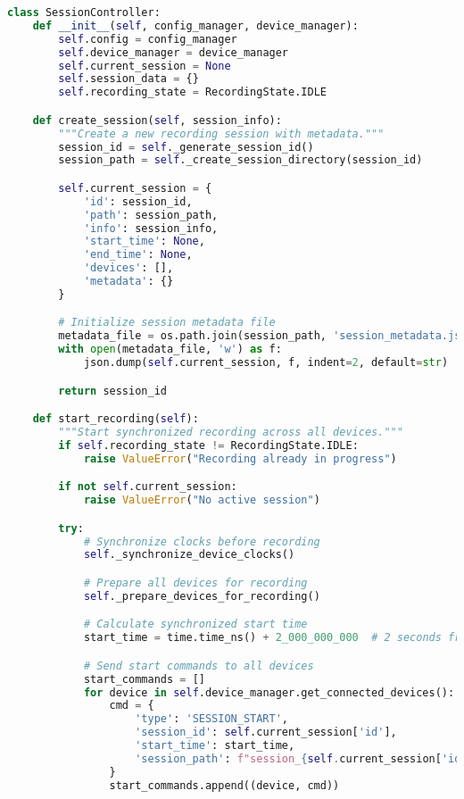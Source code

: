 \begin{lstlisting}[language=Python, caption=Session Management Implementation]
class SessionController:
    def __init__(self, config_manager, device_manager):
        self.config = config_manager
        self.device_manager = device_manager
        self.current_session = None
        self.session_data = {}
        self.recording_state = RecordingState.IDLE

    def create_session(self, session_info):
        """Create a new recording session with metadata."""
        session_id = self._generate_session_id()
        session_path = self._create_session_directory(session_id)

        self.current_session = {
            'id': session_id,
            'path': session_path,
            'info': session_info,
            'start_time': None,
            'end_time': None,
            'devices': [],
            'metadata': {}
        }

        # Initialize session metadata file
        metadata_file = os.path.join(session_path, 'session_metadata.json')
        with open(metadata_file, 'w') as f:
            json.dump(self.current_session, f, indent=2, default=str)

        return session_id

    def start_recording(self):
        """Start synchronized recording across all devices."""
        if self.recording_state != RecordingState.IDLE:
            raise ValueError("Recording already in progress")

        if not self.current_session:
            raise ValueError("No active session")

        try:
            # Synchronize clocks before recording
            self._synchronize_device_clocks()

            # Prepare all devices for recording
            self._prepare_devices_for_recording()

            # Calculate synchronized start time
            start_time = time.time_ns() + 2_000_000_000  # 2 seconds from now

            # Send start commands to all devices
            start_commands = []
            for device in self.device_manager.get_connected_devices():
                cmd = {
                    'type': 'SESSION_START',
                    'session_id': self.current_session['id'],
                    'start_time': start_time,
                    'session_path': f"session_{self.current_session['id']}"
                }
                start_commands.append((device, cmd))


\end{lstlisting}
